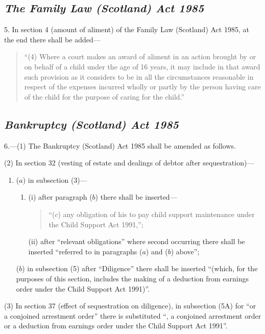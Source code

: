 \documentclass[12pt,a4paper]{article}
\begin{document}
\subsection*{\itshape The Family Law (Scotland) Act 1985}

5. In section 4 (amount of aliment) of the Family Law (Scotland) Act 1985, at the end there shall be added—
\begin{quotation}
“(4) Where a court makes an award of aliment in an action brought by or on behalf of a child under the age of 16 years, it may include in that award such provision as it considers to be in all the circumstances reasonable in respect of the expenses incurred wholly or partly by the person having care of the child for the purpose of caring for the child.”
\end{quotation}

\subsection*{\itshape Bankruptcy (Scotland) Act 1985}

6.---(1) The Bankruptcy (Scotland) Act 1985 shall be amended as follows.

(2) In section 32 (vesting of estate and dealings of debtor after sequestration)—
\begin{enumerate}\item[]
($a$) in subsection (3)—
\begin{enumerate}\item[]
(i) after paragraph ($b$)  there shall be inserted—
\begin{quotation}
“($c$) any obligation of his to pay child support maintenance under the Child Support Act 1991,”;
\end{quotation}

(ii) after “relevant obligations” where second occurring there shall be inserted “referred to in paragraphs ($a$)  and ($b$)  above”;
\end{enumerate}

($b$) in subsection (5)  after “Diligence” there shall be inserted “(which, for the purposes of this section, includes the making of a deduction from earnings order under the Child Support Act 1991)”.
\end{enumerate}

(3) In section 37 (effect of sequestration on diligence), in subsection (5A)  for “or a conjoined arrestment order” there is substituted “, a conjoined arrestment order or a deduction from earnings order under the Child Support Act 1991”.
\end{document}
